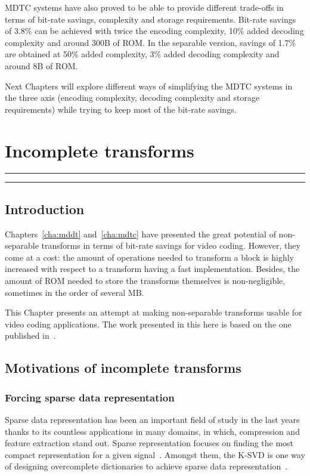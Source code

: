 \documentclass[11pt,a4paper,openright,twoside]{book}
\providecommand{\chaptertoc}{
	\startcontents[chapters]
	\hrule
	\vspace{1em}
	\printcontents[chapters]{}{1}{{\bf\large Contents}}
	\hrule
}
\numberwithin{equation}{section} %
\numberwithin{figure}{section} %
\numberwithin{table}{section} %
\begin{document}
\ac{MDTC} systems have also proved to be able to provide different trade-offs
in terms of bit-rate savings, complexity and storage requirements.
Bit-rate savings of 3.8\% can be achieved with twice the encoding complexity,
10\% added decoding complexity and around \unit{300}{\kilo B} of \acs{ROM}.
In the separable version, savings of 1.7\% are obtained at 50\% added
complexity, 3\% added decoding complexity and around \unit{8}{\kilo B} of
\acs{ROM}.

Next Chapters will explore different ways of simplifying the \ac{MDTC} systems
in the three axis (encoding complexity, decoding complexity and storage
requirements) while trying to keep most of the bit-rate savings.

\chapter{Incomplete transforms}
\label{cha:incomplete_transforms}
\chaptertoc

\section{Introduction}
\label{sec:it_introduction}

Chapters~\ref{cha:mddt} and~\ref{cha:mdtc} have presented the great potential
of non-separable transforms in terms of bit-rate savings for video coding.
However, they come at a cost:
the amount of operations needed to transform a block is highly increased with
respect to a transform having a fast implementation.
Besides, the amount of \acs{ROM} needed to store the transforms themselves is
non-negligible, sometimes in the order of several MB.

This Chapter presents an attempt at making non-separable transforms usable for
video coding applications.
The work presented in this here is based on the one published
in~\cite{arrufat-15-inc-transforms}.

\section{Motivations of incomplete transforms}
\label{sec:it_motivations}

\subsection{Forcing sparse data representation}
\label{sub:it_forcing_sparse_data_representation}

Sparse data representation has been an important field of study in the last
years thanks to its countless applications in many domains, in which,
compression and feature extraction stand out.
Sparse representation focuses on finding the most compact representation for a
given signal~\cite{huang-06-sparse-representation}.
Amongst them, the K-\acs{SVD} is one way of designing overcomplete
dictionaries to achieve sparse data
representation~\cite{aharon-06-overcomplete-sparse-dict}.
\end{document}
